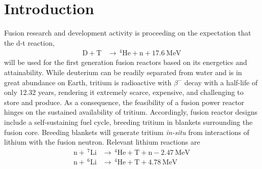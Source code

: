

\chapter{Introduction} \label{sec:introduction}
Fusion research and development activity is proceeding on the expectation that the d-t reaction,
\begin{align}
\mathrm{D} + \mathrm{T}&\xrightarrow{}\,^4\mathrm{He}+\mathrm{n} + \SI{17.6}{\mega\electronvolt}
\end{align}
will be used for the first generation fusion reactors based on its energetics and attainability. While deuterium can be readily separated from water and is in great abundance on Earth, tritium is radioactive with $\beta^-$ decay with a half-life of only 12.32 years, rendering it extremely scarce, expensive, and challenging to store and produce. As a consequence, the feasibility of a fusion power reactor hinges on the sustained availability of tritium. Accordingly, fusion reactor designs include a self-sustaining fuel cycle, breeding tritium in blankets surrounding the fusion core. Breeding blankets will generate tritium \textit{in-situ} from interactions of lithium with the fusion neutron. Relevant lithium reactions are
\begin{align}
\mathrm{n} + \,^7\mathrm{Li} &\xrightarrow \,\,^4\mathrm{He} + \mathrm{T} +\mathrm{n} -\SI{2.47}{\mega\electronvolt}\label{eq:Li7T}\\
\mathrm{n} + \,^6\mathrm{Li} &\xrightarrow \,\,^4\mathrm{He} + \mathrm{T} + \SI{4.78}{\mega\electronvolt} \label{eq:Li6T}
\end{align}

